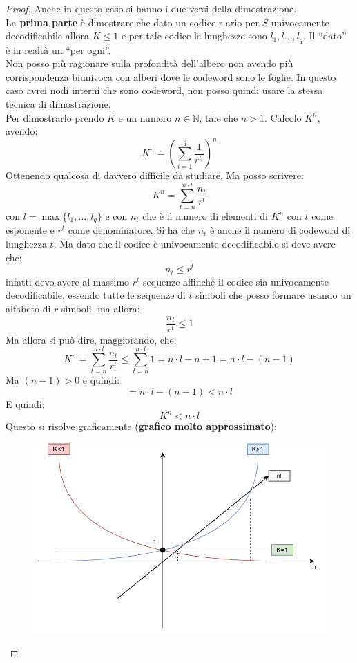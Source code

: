 \documentclass[a4paper,12pt, oneside]{book}
\begin{document}
\begin{proof}
  Anche in questo caso si hanno i due versi della dimostrazione.\\
  La \textbf{prima parte} è dimostrare che dato un codice r-ario per $S$
  univocamente decodificabile allora $K\leq 1$ e per tale codice le lunghezze
  sono $l_1,l\dots,l_q$. Il ``dato'' è in realtà un ``per ogni''.\\
  Non posso più ragionare sulla profondità dell'albero non avendo più
  corrispondenza biunivoca con alberi dove le codeword sono le foglie. In questo
  caso avrei nodi interni che sono codeword, non posso quindi usare la stessa
  tecnica di dimostrazione.\\
  Per dimostrarlo prendo $K$ e un numero $n\in\mathbb{N}$, tale che
  $n>1$. Calcolo $K^n$, avendo:
  \[K^n=\left(\sum_{i=1}^q\frac{1}{r^{l_i}}\right)^n\]
  Ottenendo qualcosa di davvero difficile da studiare. Ma posso scrivere:
  \[K^n=\sum_{t=n}^{n\cdot l}\frac{n_t}{r^{t}}\]
  con $l=\max\{l_1,\ldots,l_q\}$ e con $n_t$ che è il numero di elementi di
  $K^n$ con $t$ come esponente e $r^t$ come denominatore. Si ha che $n_t$ è
  anche il numero di codeword 
  di lunghezza $t$. Ma dato che il codice è univocamente decodificabile si deve
  avere che: 
  \[n_t\leq r^t\]
  infatti devo avere al massimo $r^t$ sequenze affinché il codice sia
  univocamente decodificabile, essendo tutte le sequenze di $t$ simboli
  che posso formare usando un alfabeto di $r$ simboli.  
  ma allora:
  \[\frac{n_t}{r^{t}}\leq 1\]
  Ma allora si può dire, maggiorando, che:
  \[K^n=\sum_{t=n}^{n\cdot l}\frac{n_t}{r^{t}}\leq \sum_{t=n}^{n\cdot
      l}1=n\cdot l-n+1=n\cdot l-(n-1)\]
  Ma $(n-1)>0$ e quindi:
  \[=n\cdot l-(n-1) < n\cdot l\]
  E quindi:
  \[K^n<n\cdot l\]
  \newpage
  Questo si risolve graficamente (\textbf{grafico molto approssimato}):
  \begin{figure}[H]
    \centering
    \includegraphics[scale = 0.8]{img/grap.pdf}

\end{figure}
\end{proof}
\end{document}
